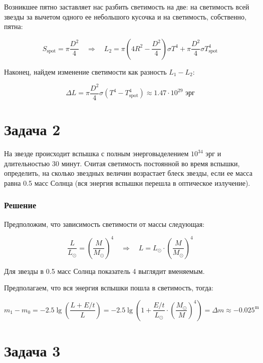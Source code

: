 \documentclass[a4paper, 12pt]{article}
\newcommand{\qrq}
{\ensuremath{\quad \Rightarrow \quad}} %
\begin{document}
Возникшее пятно заставляет нас разбить светимость на две: на светимость всей звезды за вычетом одного ее небольшого кусочка и на светимость, собственно, пятна:

\begin{equation}
	S_{\text{spot}} = \pi\frac{D^2}{4} \qrq L_2 = \pi\left(4R^2 - \frac{D^2}{4}\right) \sigma T^4 + \pi \frac{D^2}{4}\sigma T^4_{\text{spot}}
\end{equation}

Наконец, найдем изменение светимости как разность $L_1 - L_2$:

\begin{equation}
	\boxed{\Delta L = \pi\frac{D^2}{4}\sigma \left(T^4 - T^4_{\text{spot}}\right) \approx 1.47 \cdot 10^{29} \text{ эрг}}
\end{equation}

\section*{Задача 2}

На звезде происходит вспышка с полным энерговыделением $10^{34}$ эрг и длительностью 30 минут. Считая светимость постоянной во время вспышки, определить, на сколько звездных величин возрастает блеск звезды, если ее масса равна 0.5 масс Солнца (вся энергия вспышки перешла в оптическое излучение).

\subsubsection*{Решение}

Предположим, что зависимость светимости от массы следующая:

\begin{equation}
	\frac{L}{L_{\odot}} = \left(\frac{M}{M_{\odot}}\right)^4 \qrq L = L_{\odot} \cdot \left(\frac{M}{M_{\odot}}\right)^4
\end{equation}

Для звезды в 0.5 масс Солнца показатель 4 выглядит вменяемым.

Предполагаем, что вся энергия вспышки пошла в светимость, тогда:

\begin{equation}
	m_1 - m_0 = -2.5 \lg \left(\frac{L + E/t}{L}\right) = \boxed{-2.5 \lg \left(1 + \frac{E/t}{L_{\odot}} \cdot \left(\frac{M_{\odot}}{M}\right)^4\right) = \Delta m \approx -0.025^\text{m}}
\end{equation}

\section*{Задача 3}
\end{document}
